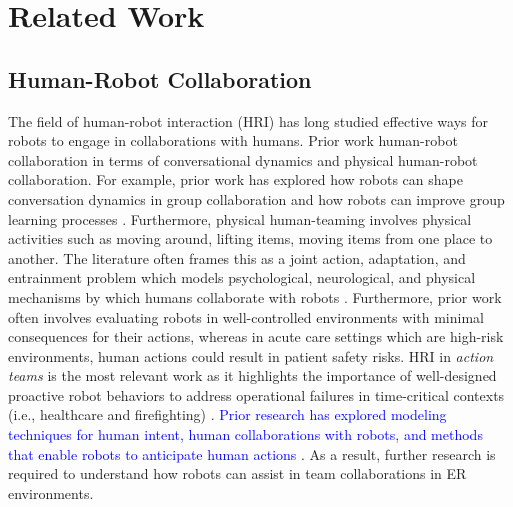 \section{Related Work}
\subsection{Human-Robot Collaboration} 

The field of human-robot interaction (HRI) has long studied effective ways for robots to engage in collaborations with humans. 
Prior work human-robot collaboration in terms of conversational dynamics and physical human-robot collaboration.%
For example, prior work has explored how robots can shape conversation dynamics in group collaboration \cite{tennent2019micbot} and how robots can improve group learning processes \cite{alves2019empathic}. 
Furthermore, physical human-teaming involves physical activities such as moving around, lifting items, moving items from one place to another. 
The literature often frames this as a joint action, adaptation, and entrainment problem which models psychological, neurological, and physical mechanisms by which humans collaborate with robots \cite{fourie2022joint,iqbal2016movement,iqbal2017coordination}. 
Furthermore, prior work often involves evaluating robots in well-controlled environments with minimal consequences for their actions, whereas in acute care settings which are high-risk environments, human actions could result in patient safety risks. 
HRI in \textit{action teams} is the most relevant work as it highlights the importance of well-designed proactive robot behaviors to address operational failures in time-critical contexts (i.e., healthcare and firefighting) \cite{jamshad2024taking}. 
\textcolor{blue}{Prior research has explored modeling techniques for human intent, human collaborations with robots, and methods that enable robots to anticipate human actions} \cite{levine2014concurrent,nikolaidis2013human,dominey2008anticipation,hoffman2007effects}.
As a result, further research is required to understand how robots can assist in team collaborations in ER environments.


